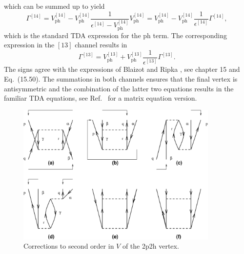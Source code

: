 which can be summed up to yield 
\begin{equation}
  \Gamma^{[14]}=V^{[14]}_{\mathrm{ph}}-
   V^{[14]}_{\mathrm{ph}}
   \frac{1}
   {\epsilon^{[14]}-V^{[14]}_{\mathrm{ph}}}
   V^{[14]}_{\mathrm{ph}}=
   V^{[14]}_{\mathrm{ph}}-
   V^{[14]}_{\mathrm{ph}}
   \frac{1}{\epsilon^{[14]}}\Gamma^{[14]},
   \label{Morten:eq:screening1}
\end{equation}
which is the standard TDA expression for the ph term.
The corresponding expression in the $[13]$ channel 
results in
\begin{equation}
  \Gamma^{[13]}=V^{[13]}_{\mathrm{ph}}+
   V^{[13]}_{\mathrm{ph}}
   \frac{1}{\epsilon^{[13]}}\Gamma^{[13]}.
\end{equation}
The signs agree with the 
expressions of Blaizot and Ripka \cite{Morten:br86}, see chapter 15 and
Eq.~(15.50).
The summations in both channels ensures that the final vertex
is antisymmetric and the combination of 
the latter two equations results in the familiar
TDA equations, see  Ref.~ for a matrix equation
version. 

\begin{figure}%
	\begin{center}
      	\includegraphics[width=10cm]{ph22.eps}
	\end{center}
       \caption{Corrections to second order in $V$ of the 2p2h
               vertex.}
       \label{Morten:fig:pphhvertex}
\end{figure}



